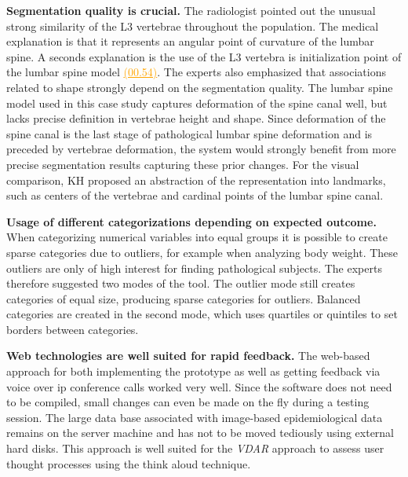 \documentclass[journal]{style/vgtc} 			          %
\newcommand{\rem}[1]{\textcolor{red}{\sout{#1}}}
\newcommand{\com}[1]{\textcolor{orange}{\uline{#1}}}
\begin{document}
\textbf{Segmentation quality is crucial.}
The radiologist pointed out the unusual strong similarity of the L3 vertebrae throughout the population.
%
The medical explanation is that it represents an angular point of curvature of the lumbar spine.
%
A seconds explanation is the use of the L3 vertebra is initialization point of the lumbar spine model \com{(00.54)}.
%
The experts also emphasized that associations related to shape strongly depend on the segmentation quality.
%
The lumbar spine model used in this case study captures deformation of the spine canal well, but lacks precise definition in vertebrae height and shape.
%
Since deformation of the spine canal is the last stage of pathological lumbar spine deformation and is preceded by vertebrae deformation, the system would strongly benefit from more precise segmentation results capturing these prior changes.
%
For the visual comparison, KH proposed an abstraction of the representation into landmarks, such as centers of the vertebrae and cardinal points of the lumbar spine canal.

\textbf{Usage of different categorizations depending on expected outcome.}
When categorizing numerical variables into equal groups it is possible to create sparse categories due to outliers, for example when analyzing body weight.
%
These outliers are only of high interest for finding pathological subjects. %
%
The experts therefore suggested two modes of the tool.
%
The outlier mode still creates categories of equal size, producing sparse categories for outliers.
%
Balanced categories are created in the second mode, which uses quartiles or quintiles to set borders between categories.
%

\textbf{Web technologies are well suited for rapid feedback.}
The web-based approach for both implementing the prototype as well as getting feedback via voice over ip conference calls worked very well.
%
Since the software does not need to be compiled, small changes can even be made on the fly during a testing session.
%
The large data base associated with image-based epidemiological data remains on the server machine and has not to be moved tediously using external hard disks.
%
This approach is well suited for the \emph{VDAR} approach to assess user thought processes using the think aloud technique.
\end{document}
